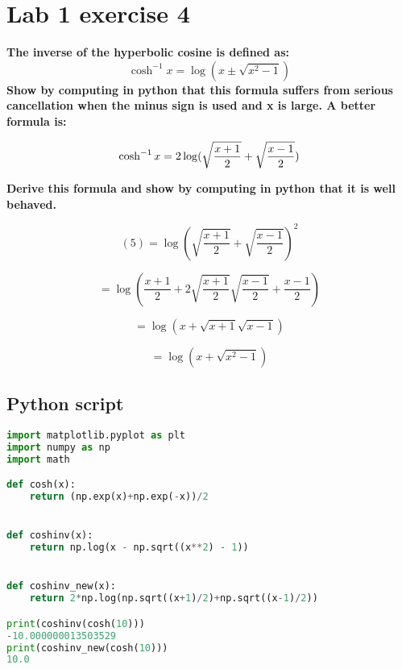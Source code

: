 \documentclass[a4paper]{article}
\begin{document}
\newpage
\section{Lab 1 exercise 4}
\textbf{The inverse of the hyperbolic cosine is defined as: }
\begin{equation}
	\cosh^{-1}x = \log\left(x\pm \sqrt{x^2-1}   \right) 	 
\end{equation}
\textbf{Show by computing in python that this formula suffers from serious cancellation when the minus sign is used and x is large. A better formula is:}

\begin{equation}
	\cosh^{-1}x = 2\log(\sqrt{\frac{x+1}{2}} + \sqrt{\frac{x-1}{2}})  \\
\end{equation}

\textbf{Derive this formula and show by computing in python that it is well behaved.}



\begin{equation}
	(5) = \log(\sqrt{\frac{x+1}{2}} + \sqrt{\frac{x-1}{2}})^{2}
\nonumber
\end{equation}

\begin{equation}
	= \log(\frac{x+1}{2} +2 \sqrt{\frac{x+1}{2}}\sqrt{\frac{x-1}{2}} + \frac{x-1}{2})
\nonumber
\end{equation}

\begin{equation}
	= \log(x + \sqrt{x+1}\sqrt{x-1})
\nonumber
\end{equation}

\begin{equation}
	= \log(x + \sqrt{x^2-1})
\nonumber
\end{equation}

\subsection{Python script}
\begin{lstlisting}[language=Python]
import matplotlib.pyplot as plt
import numpy as np
import math

def cosh(x):
    return (np.exp(x)+np.exp(-x))/2


def coshinv(x):
    return np.log(x - np.sqrt((x**2) - 1))


def coshinv_new(x):
    return 2*np.log(np.sqrt((x+1)/2)+np.sqrt((x-1)/2))

print(coshinv(cosh(10)))
-10.000000013503529
print(coshinv_new(cosh(10)))
10.0

\end{lstlisting}
\end{document}
